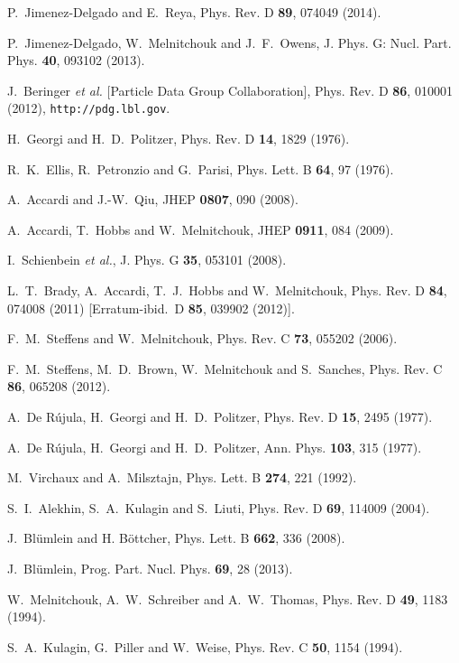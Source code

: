 \documentclass[aps,prd,amsmath,preprint]{revtex4}
\begin{document}
\begin{thebibliography}{99}
P.~Jimenez-Delgado and E.~Reya,
Phys. Rev. D {\bf 89}, 074049 (2014).

P.~Jimenez-Delgado, W.~Melnitchouk and J.~F.~Owens,
J. Phys. G: Nucl. Part. Phys. {\bf 40}, 093102 (2013).

J.~Beringer {\it et al.} [Particle Data Group Collaboration],
Phys. Rev. D {\bf 86}, 010001 (2012),
{\tt http://pdg.lbl.gov}.

H.~Georgi and H.~D.~Politzer,
Phys. Rev. D {\bf 14}, 1829 (1976).

R.~K.~Ellis, R.~Petronzio and G.~Parisi,
Phys. Lett. B {\bf 64}, 97 (1976).

A.~Accardi and J.-W.~Qiu,
JHEP {\bf 0807}, 090 (2008).

A.~Accardi, T.~Hobbs and W.~Melnitchouk,
JHEP {\bf 0911}, 084 (2009).

I.~Schienbein {\it et al.},
J. Phys. G {\bf 35}, 053101 (2008).

L.~T.~Brady, A.~Accardi, T.~J.~Hobbs and W.~Melnitchouk,
Phys. Rev. D {\bf 84}, 074008 (2011)
[Erratum-ibid.\ D {\bf 85}, 039902 (2012)].

F.~M.~Steffens and W.~Melnitchouk,
Phys. Rev. C {\bf 73}, 055202 (2006).

F.~M.~Steffens, M.~D.~Brown, W.~Melnitchouk and S.~Sanches,
Phys. Rev. C {\bf 86}, 065208 (2012).

A.~De R\'ujula, H.~Georgi and H.~D.~Politzer,
Phys. Rev. D {\bf 15}, 2495 (1977).

A.~De R\'ujula, H.~Georgi and H.~D.~Politzer,
Ann. Phys. {\bf 103}, 315 (1977).

M.~Virchaux and A.~Milsztajn,
Phys. Lett. B {\bf 274}, 221 (1992).

S.~I.~Alekhin, S.~A.~Kulagin and S.~Liuti,
Phys. Rev. D {\bf 69}, 114009 (2004).

J.~Bl\"umlein and H. B\"ottcher,
Phys. Lett. B {\bf 662}, 336 (2008).

J.~Bl\"umlein,
Prog. Part. Nucl. Phys. {\bf 69}, 28 (2013).

W.~Melnitchouk, A.~W.~Schreiber and A.~W.~Thomas,
Phys. Rev. D {\bf 49}, 1183 (1994).

S.~A.~Kulagin, G.~Piller and W.~Weise,
Phys. Rev. C {\bf 50}, 1154 (1994).


\end{thebibliography}
\end{document}
